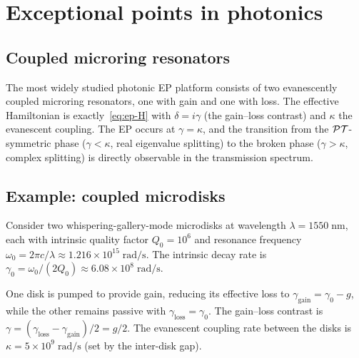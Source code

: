 \section{Exceptional points in photonics}
\label{sec:ep-photonics}

\subsection{Coupled microring resonators}
\label{ssec:ep-microrings}

The most widely studied photonic EP platform consists of two evanescently
coupled microring resonators, one with gain and one with loss. The
effective Hamiltonian is exactly~\eqref{eq:ep-H} with $\delta = i\gamma$
(the gain--loss contrast) and $\kappa$ the evanescent coupling. The EP
occurs at $\gamma = \kappa$, and the transition from the $\mathcal{PT}$-symmetric
phase ($\gamma < \kappa$, real eigenvalue splitting) to the broken phase
($\gamma > \kappa$, complex splitting) is directly observable in the
transmission spectrum.

\subsection{Example: coupled microdisks}
\label{ssec:ep-worked-example}

Consider two whispering-gallery-mode microdisks at wavelength
$\lambda = 1550\;\mathrm{nm}$, each with intrinsic quality factor
$Q_0 = 10^6$ and resonance frequency
$\omega_0 = 2\pi c/\lambda \approx 1.216 \times 10^{15}\;\mathrm{rad/s}$.
The intrinsic decay rate is
$\gamma_0 = \omega_0/(2Q_0) \approx 6.08 \times 10^{8}\;\mathrm{rad/s}$.

One disk is pumped to provide gain, reducing its effective loss to
$\gamma_{\mathrm{gain}} = \gamma_0 - g$, while the other remains passive
with $\gamma_{\mathrm{loss}} = \gamma_0$. The gain--loss contrast is
$\gamma = (\gamma_{\mathrm{loss}} - \gamma_{\mathrm{gain}})/2 = g/2$.
The evanescent coupling rate between the disks is
$\kappa = 5 \times 10^9\;\mathrm{rad/s}$ (set by the inter-disk gap).

